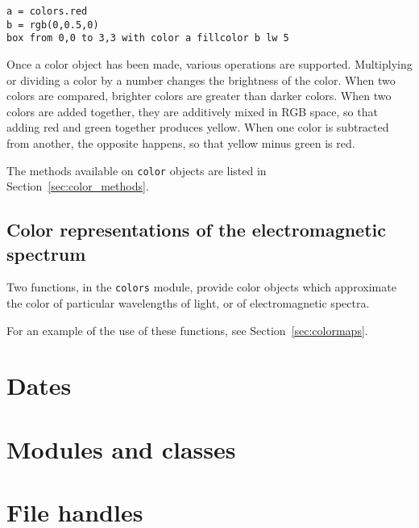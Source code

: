 \begin{verbatim}
a = colors.red
b = rgb(0,0.5,0)
box from 0,0 to 3,3 with color a fillcolor b lw 5
\end{verbatim}

Once a color object has been made, various operations are supported.
Multiplying or dividing a color by a number changes the brightness of the
color. When two colors are compared, brighter colors are greater than darker
colors. When two colors are added together, they are additively mixed in RGB
space, so that adding red and green together produces yellow. When one color is
subtracted from another, the opposite happens, so that yellow minus green is
red.

\noindent The methods available on {\tt color} objects are listed in
Section~\ref{sec:color_methods}.

\subsection{Color representations of the electromagnetic spectrum}

Two functions, in the {\tt colors} module, provide color objects which
approximate the color of particular wavelengths of light, or of electromagnetic
spectra.


\noindent For an example of the use of these functions, see
Section~\ref{sec:colormaps}.

\section{Dates}

\section{Modules and classes}

\section{File handles}

